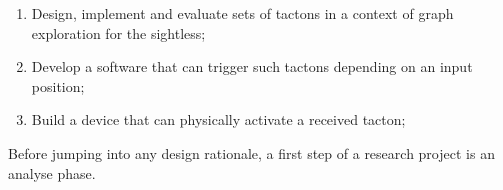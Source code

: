 \begin{enumerate}
	\item Design, implement and evaluate sets of tactons in a context of graph exploration for the sightless;
	\item Develop a software that can trigger such tactons depending on an input position;
	\item Build a device that can physically activate a received tacton;
\end{enumerate}


Before jumping into any design rationale, a first step of a research project is an analyse phase.


